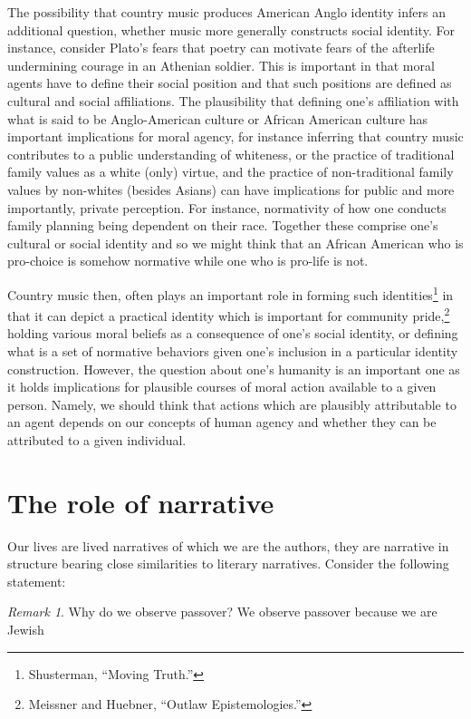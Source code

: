 \documentclass[
  12pt,
]{book}
\theoremstyle{definition}
\theoremstyle{definition}
\theoremstyle{definition}
\theoremstyle{definition}
\theoremstyle{remark}
\newtheorem*{remark}{Remark}
\begin{document}
The possibility that country music produces American Anglo identity infers an additional question, whether music more generally constructs social identity. For instance, consider Plato's fears that poetry can motivate fears of the afterlife undermining courage in an Athenian soldier. This is important in that moral agents have to define their social position and that such positions are defined as cultural and social affiliations. The plausibility that defining one's affiliation with what is said to be Anglo-American culture or African American culture has important implications for moral agency, for instance inferring that country music contributes to a public understanding of whiteness, or the practice of traditional family values as a white (only) virtue, and the practice of non-traditional family values by non-whites (besides Asians) can have implications for public and more importantly, private perception. For instance, normativity of how one conducts family planning being dependent on their race. Together these comprise one's cultural or social identity and so we might think that an African American who is pro-choice is somehow normative while one who is pro-life is not.

Country music then, often plays an important role in forming such identities\footnote{Shusterman, {``Moving {Truth}.''}} in that it can depict a practical identity which is important for community pride,\footnote{Meissner and Huebner, {``Outlaw Epistemologies.''}} holding various moral beliefs as a consequence of one's social identity, or defining what is a set of normative behaviors given one's inclusion in a particular identity construction. However, the question about one's humanity is an important one as it holds implications for plausible courses of moral action available to a given person. Namely, we should think that actions which are plausibly attributable to an agent depends on our concepts of human agency and whether they can be attributed to a given individual.

\section{The role of narrative}\label{the-role-of-narrative}

Our lives are lived narratives of which we are the authors, they are narrative in structure bearing close similarities to literary narratives. Consider the following statement:

\begin{remark}
Why do we observe passover? We observe passover because we are Jewish
\end{remark}
\end{document}
